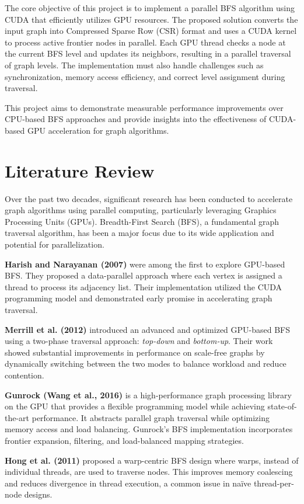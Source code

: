\documentclass[a4paper,12pt]{article}
\begin{document}
\begin{center}
The core objective of this project is to implement a parallel BFS algorithm using CUDA that efficiently utilizes GPU resources. The proposed solution converts the input graph into Compressed Sparse Row (CSR) format and uses a CUDA kernel to process active frontier nodes in parallel. Each GPU thread checks a node at the current BFS level and updates its neighbors, resulting in a parallel traversal of graph levels. The implementation must also handle challenges such as synchronization, memory access efficiency, and correct level assignment during traversal.

This project aims to demonstrate measurable performance improvements over CPU-based BFS approaches and provide insights into the effectiveness of CUDA-based GPU acceleration for graph algorithms.
\newpage
\section*{Literature Review}

Over the past two decades, significant research has been conducted to accelerate graph algorithms using parallel computing, particularly leveraging Graphics Processing Units (GPUs). Breadth-First Search (BFS), a fundamental graph traversal algorithm, has been a major focus due to its wide application and potential for parallelization.

\textbf{Harish and Narayanan (2007)} were among the first to explore GPU-based BFS. They proposed a data-parallel approach where each vertex is assigned a thread to process its adjacency list. Their implementation utilized the CUDA programming model and demonstrated early promise in accelerating graph traversal.

\textbf{Merrill et al. (2012)} introduced an advanced and optimized GPU-based BFS using a two-phase traversal approach: \textit{top-down} and \textit{bottom-up}. Their work showed substantial improvements in performance on scale-free graphs by dynamically switching between the two modes to balance workload and reduce contention.

\textbf{Gunrock (Wang et al., 2016)} is a high-performance graph processing library on the GPU that provides a flexible programming model while achieving state-of-the-art performance. It abstracts parallel graph traversal while optimizing memory access and load balancing. Gunrock’s BFS implementation incorporates frontier expansion, filtering, and load-balanced mapping strategies.

\textbf{Hong et al. (2011)} proposed a warp-centric BFS design where warps, instead of individual threads, are used to traverse nodes. This improves memory coalescing and reduces divergence in thread execution, a common issue in naïve thread-per-node designs.


\end{center}
\end{document}
